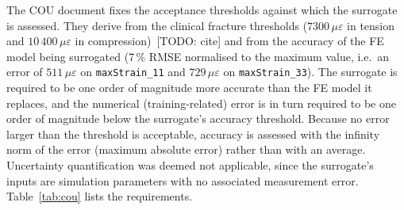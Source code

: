 The COU document fixes the acceptance thresholds against which the surrogate
is assessed. They derive from the clinical fracture thresholds
($7300\,\mu\varepsilon$ in tension and $10\,400\,\mu\varepsilon$ in
compression)~[TODO: cite] and from the accuracy of the FE model being
surrogated (7\,\% RMSE normalised to the maximum value, i.e.\ an error of
$511\,\mu\varepsilon$ on \texttt{maxStrain\_11} and
$729\,\mu\varepsilon$ on \texttt{maxStrain\_33}). The surrogate is
required to be one order of magnitude more accurate than the FE model it
replaces, and the numerical (training-related) error is in turn required to
be one order of magnitude below the surrogate's accuracy threshold.
Because no error larger than the threshold is acceptable, accuracy is
assessed with the infinity norm of the error (maximum absolute error) rather
than with an average. Uncertainty quantification was deemed not applicable,
since the surrogate's inputs are simulation parameters with no associated
measurement error. Table~\ref{tab:cou} lists the requirements.

